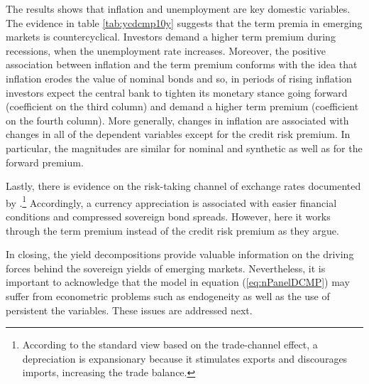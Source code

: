 {%

The results shows that inflation and unemployment are key domestic variables.
The evidence in table \ref{tab:ycdcmp10y} suggests that the term premia in emerging markets is countercyclical.
Investors demand a higher term premium during recessions, when the unemployment rate increases. 
Moreover, the positive association between inflation and the term premium conforms with the idea that inflation erodes the value of nominal bonds and so, in periods of rising inflation investors expect the central bank to tighten its monetary stance going forward (coefficient on the third column) and demand a higher term premium (coefficient on the fourth column). 
More generally, changes in inflation are associated with changes in all of the dependent variables except for the credit risk premium. 
In particular, the magnitudes are similar for nominal and synthetic as well as for the forward premium.

Lastly, there is evidence on the risk-taking channel of exchange rates documented by \cite{HofmannShimShin:2019}.\footnote{ According to the standard view based on the trade-channel effect, a depreciation is expansionary because it stimulates exports and discourages imports, increasing the trade balance.} 
Accordingly, a currency appreciation is associated with easier financial conditions and compressed sovereign bond spreads.
However, here it works through the term premium instead of the credit risk premium as they argue.

In closing, the yield decompositions provide valuable information on the driving forces behind the sovereign yields of emerging markets.
Nevertheless, it is important to acknowledge that the model in equation (\ref{eq:nPanelDCMP}) may suffer from econometric problems such as endogeneity as well as the use of persistent the variables.
These issues are addressed next.


}
